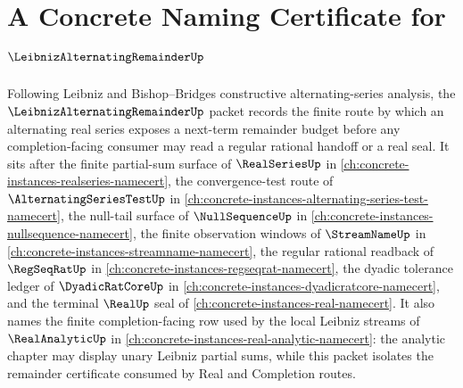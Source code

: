 \chapter{A Concrete Naming Certificate for $\LeibnizAlternatingRemainderUp$}
\label{ch:concrete-instances-leibniz-alternating-remainder-namecert}

Following Leibniz and Bishop--Bridges constructive alternating-series analysis, the $\LeibnizAlternatingRemainderUp$ packet records the finite route by which an alternating real series exposes a next-term remainder budget before any completion-facing consumer may read a regular rational handoff or a real seal. It sits after the finite partial-sum surface of $\RealSeriesUp$ in \autoref{ch:concrete-instances-realseries-namecert}, the convergence-test route of $\AlternatingSeriesTestUp$ in \autoref{ch:concrete-instances-alternating-series-test-namecert}, the null-tail surface of $\NullSequenceUp$ in \autoref{ch:concrete-instances-nullsequence-namecert}, the finite observation windows of $\StreamNameUp$ in \autoref{ch:concrete-instances-streamname-namecert}, the regular rational readback of $\RegSeqRatUp$ in \autoref{ch:concrete-instances-regseqrat-namecert}, the dyadic tolerance ledger of $\DyadicRatCoreUp$ in \autoref{ch:concrete-instances-dyadicratcore-namecert}, and the terminal $\RealUp$ seal of \autoref{ch:concrete-instances-real-namecert}. It also names the finite completion-facing row used by the local Leibniz streams of $\RealAnalyticUp$ in \autoref{ch:concrete-instances-real-analytic-namecert}: the analytic chapter may display unary Leibniz partial sums, while this packet isolates the remainder certificate consumed by Real and Completion routes.

